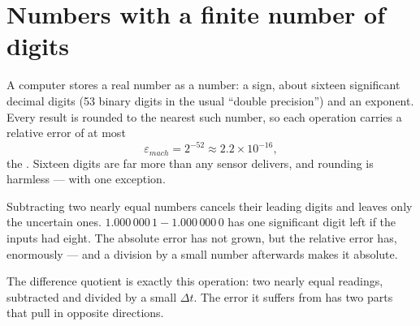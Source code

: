 \label{app:num}


\section{Numbers with a finite number of digits}

A computer stores a real number as a  number: a sign, about sixteen significant decimal digits (53 binary digits in the usual \enquote{double precision}) and an exponent. Every result is rounded to the nearest such number, so each operation carries a relative error of at most
\begin{equation}
  \varepsilon_{mach} = 2^{-52} \approx 2.2 \times 10^{-16} ,
\end{equation}
the . Sixteen digits are far more than any sensor delivers, and rounding is harmless — with one exception.

\begin{watchout}[Cancellation]
Subtracting two nearly equal numbers cancels their leading digits and leaves only the uncertain ones. $1.000\,000\,1 - 1.000\,000\,0$ has one significant digit left if the inputs had eight. The absolute error has not grown, but the relative error has, enormously — and a division by a small number afterwards makes it absolute.
\end{watchout}

The difference quotient is exactly this operation: two nearly equal readings, subtracted and divided by a small $\Delta t$. The error it suffers from has two parts that pull in opposite directions.


